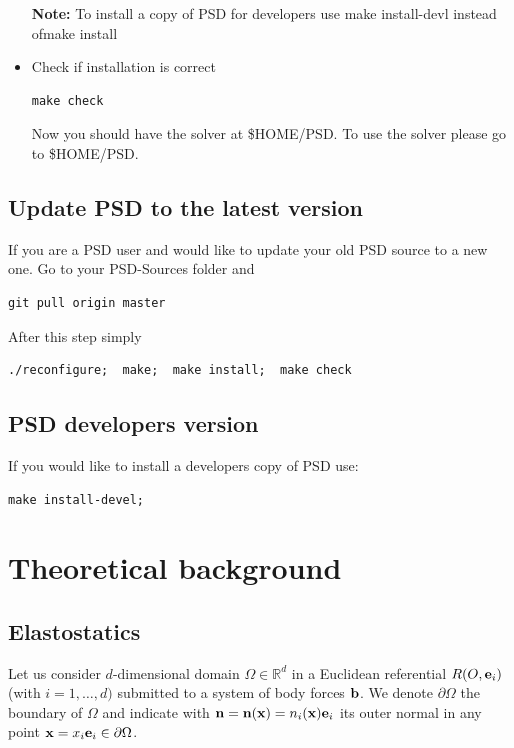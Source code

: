 \documentclass{report}
\newcommand{\bx}{\textbf{x}}
\newcommand{\bb}{\textbf{b}}
\def\bb{{\bf{b}}}
\def\be{{\bf e}}
\def\be{{\bf{e}}}
\def\bn{{\bf{n}}}
\def\bx{{\bf{x}}}
\begin{document}
\begin{itemize}
\textbf{Note:} To install a copy of PSD for developers use {\ttfamily make install-devl} instead of{\ttfamily make install} 


\item Check if installation is correct 
\begin{lstlisting}[style=Linux]
make check
\end{lstlisting}

Now you should have the solver at {\ttfamily \$HOME/PSD}. To use the solver please go to {\ttfamily \$HOME/PSD}.

\end{itemize}

\section{Update PSD to the latest version}

If you are a PSD user and would like to update your old PSD source to a new one. Go to your {\ttfamily PSD-Sources} folder and

\begin{lstlisting}[style=Linux]
git pull origin master
\end{lstlisting}

After this step simply

\begin{lstlisting}[style=Linux]
./reconfigure;  make;  make install;  make check
\end{lstlisting}

\section{PSD developers version}

If you would like to install  a developers copy  of PSD use:

\begin{lstlisting}[style=Linux]
make install-devel;
\end{lstlisting}




\chapter{Theoretical background}

\section{Elastostatics}

Let us consider $d$-dimensional domain $\Omega\in\mathbb{R}^{d}$ in a Euclidean referential $R(O,\be_{i})$ (with $i=1,\dots,d)$ submitted to a system of body forces $\bb$. We denote $\partial\Omega$ the boundary of $\Omega$ and indicate with $\bn=\bn(\bx)=n_{i}(\bx)\be_{i}$
its outer normal in any point $\bx=x_{i}\be_{i}\in\partial\Omega$.
\end{document}
